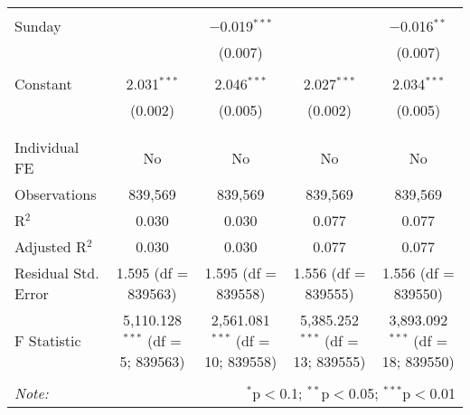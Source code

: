 \documentclass[
]{article}
\begin{document}
\begin{table}[!htbp]
{\begin{tabular}{@{\extracolsep{5pt}}lcccc}
  & & & & \\ 
 Sunday &  & $-$0.019$^{***}$ &  & $-$0.016$^{**}$ \\ 
  &  & (0.007) &  & (0.007) \\ 
  & & & & \\ 
 Constant & 2.031$^{***}$ & 2.046$^{***}$ & 2.027$^{***}$ & 2.034$^{***}$ \\ 
  & (0.002) & (0.005) & (0.002) & (0.005) \\ 
  & & & & \\ 
\hline \\[-1.8ex] 
Individual FE & No & No & No & No \\ 
Observations & 839,569 & 839,569 & 839,569 & 839,569 \\ 
R$^{2}$ & 0.030 & 0.030 & 0.077 & 0.077 \\ 
Adjusted R$^{2}$ & 0.030 & 0.030 & 0.077 & 0.077 \\ 
Residual Std. Error & 1.595 (df = 839563) & 1.595 (df = 839558) & 1.556 (df = 839555) & 1.556 (df = 839550) \\ 
F Statistic & 5,110.128$^{***}$ (df = 5; 839563) & 2,561.081$^{***}$ (df = 10; 839558) & 5,385.252$^{***}$ (df = 13; 839555) & 3,893.092$^{***}$ (df = 18; 839550) \\ 
\hline 
\hline \\[-1.8ex] 
\textit{Note:}  & \multicolumn{4}{r}{$^{*}$p$<$0.1; $^{**}$p$<$0.05; $^{***}$p$<$0.01} \\ 
\end{tabular}
} 
\end{table} 
\newpage
\end{document}
